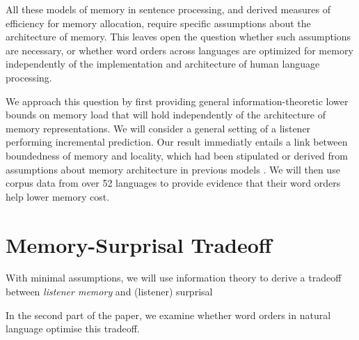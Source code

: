 \documentclass[11pt,letterpaper]{article}
\begin{document}
All these models of memory in sentence processing, and derived measures of efficiency for memory allocation, require specific assumptions about the architecture of memory.
This leaves open the question whether such assumptions are necessary, or whether word orders across languages are optimized for memory independently of the implementation and architecture of human language processing.


We approach this question by first providing general information-theoretic lower bounds on memory load that will hold independently of the architecture of memory representations.
We will consider a general setting of a listener performing incremental prediction.
Our result immediatly entails a link between boundedness of memory and locality, which had been stipulated or derived from assumptions about memory architecture in previous models \citep{gibson-linguistic-1998, lewis-activation-based-2005, futrell-noisy-context-2017}.
We will then use corpus data from over 52 languages to provide evidence that their word orders help lower memory cost.

%
%
%
%
%







\section{Memory-Surprisal Tradeoff}
\label{sec:ms-tradeoff}

With minimal assumptions, we will use information theory to derive a tradeoff between \emph{listener memory} and (listener) surprisal

In the second part of the paper, we examine whether word orders in natural language optimise this tradeoff.
\end{document}
